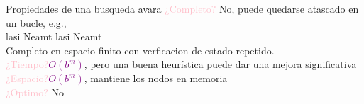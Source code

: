     \begin{frame}{Propiedades de una busqueda avara}
        \textcolor{Pink}{¿Completo?} No, puede quedarse atascado en un bucle, e.g.,\\
        lasi \longrightarrow Neamt \longrightarrow lasi \longrightarrow Neamt \longrightarrow\\
        Completo en espacio finito con verficacion de estado repetido.\\
        \textcolor{Pink}{¿Tiempo?}\textcolor{Purple}{$O(b^m)$}, pero una buena heurística puede dar una mejora significativa\\
        \textcolor{Pink}{¿Espacio?}\textcolor{Purple}{$O(b^m)$}, mantiene los nodos en memoria\\
        \textcolor{Pink}{¿Optimo?} No
    \end{frame}